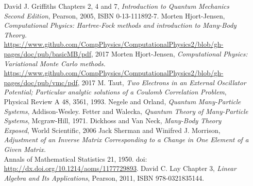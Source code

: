 \documentclass[a4paper, hidelinks, 10pt]{article}
\begin{document}
\begin{thebibliography}{}
        David J. Griffiths Chapters 2, 4 and 7,
        \textit{Introduction to Quantum Mechanics Second Edition},
        Pearson, 2005, ISBN 0-13-111892-7.
        Morten Hjort-Jensen,
        \textit{Computational Physics: Hartree-Fock methods and introduction to Many-Body Theory.} \\
        \url{https://www.github.com/CompPhysics/ComputationalPhysics2/blob/gh-pages/doc/pub/basicMB/pdf}, 2017
        Morten Hjort-Jensen,
        \textit{Computational Physics: Variational Monte Carlo methods.} \\
        \url{https://www.github.com/CompPhysics/ComputationalPhysics2/blob/gh-pages/doc/pub/vmc/pdf}, 2017
        M. Taut, 
        \textit{Two Electrons in an External Oscillator Potential; Particular analytic solutions of a Coulomb Correlation Problem},
        Physical Review A 48, 3561, 1993.
        Negele and Orland,
        \textit{Quantum Many-Particle Systems},
        Addison-Wesley.
        Fetter and Walecka,
        \textit{Quantum Theory of Many-Particle Systems},
        Mcgraw-Hill, 1971.
        Dickhoss and Van Neck,
        \textit{Many-Body Theory Exposed},
        World Scientific, 2006
        Jack Sherman and Winifred J. Morrison,
        \textit{Adjustment of an Inverse Matrix Corresponding to a Change in One Element of a Given Matrix.} \\
        Annals of Mathematical Statistics 21, 1950. doi: \url{http://dx.doi.org/10.1214/aoms/1177729893}.
        David C. Lay Chapter 3,
        \textit{Linear Algebra and Its Applications},
        Pearson, 2011, ISBN 978-0321835144.
\end{thebibliography}
\end{document}
